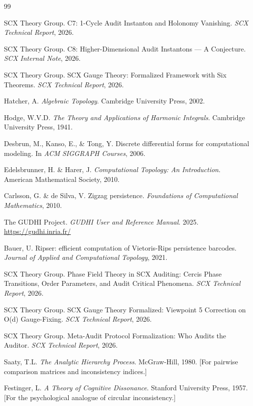 \documentclass[12pt,a4paper]{article}
\theoremstyle{plain}
\theoremstyle{definition}
\theoremstyle{remark}
\begin{document}
\begin{thebibliography}{99}

SCX Theory Group. C7: 1-Cycle Audit Instanton and Holonomy Vanishing. \textit{SCX Technical Report}, 2026.

SCX Theory Group. C8: Higher-Dimensional Audit Instantons --- A Conjecture. \textit{SCX Internal Note}, 2026.

SCX Theory Group. SCX Gauge Theory: Formalized Framework with Six Theorems. \textit{SCX Technical Report}, 2026.

Hatcher, A. \textit{Algebraic Topology}. Cambridge University Press, 2002.

Hodge, W.V.D. \textit{The Theory and Applications of Harmonic Integrals}. Cambridge University Press, 1941.

Desbrun, M., Kanso, E., \& Tong, Y. Discrete differential forms for computational modeling. In \textit{ACM SIGGRAPH Courses}, 2006.

Edelsbrunner, H. \& Harer, J. \textit{Computational Topology: An Introduction}. American Mathematical Society, 2010.

Carlsson, G. \& de Silva, V. Zigzag persistence. \textit{Foundations of Computational Mathematics}, 2010.

The GUDHI Project. \textit{GUDHI User and Reference Manual}. 2025. \url{https://gudhi.inria.fr/}

Bauer, U. Ripser: efficient computation of Vietoris-Rips persistence barcodes. \textit{Journal of Applied and Computational Topology}, 2021.

SCX Theory Group. Phase Field Theory in SCX Auditing: Cercis Phase Transitions, Order Parameters, and Audit Critical Phenomena. \textit{SCX Technical Report}, 2026.

SCX Theory Group. SCX Gauge Theory Formalized: Viewpoint 5 Correction on O(d) Gauge-Fixing. \textit{SCX Technical Report}, 2026.

SCX Theory Group. Meta-Audit Protocol Formalization: Who Audits the Auditor. \textit{SCX Technical Report}, 2026.

Saaty, T.L. \textit{The Analytic Hierarchy Process}. McGraw-Hill, 1980. [For pairwise comparison matrices and inconsistency indices.]

Festinger, L. \textit{A Theory of Cognitive Dissonance}. Stanford University Press, 1957. [For the psychological analogue of circular inconsistency.]

\end{thebibliography}
\end{document}

